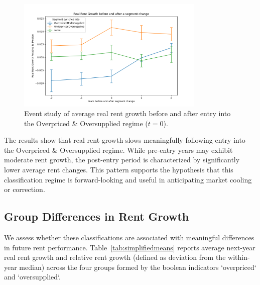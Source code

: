 \documentclass[APA,Times1COL]{WileyNJDv5} %
\begin{document}
\begin{figure}[h]
	\centering
	\includegraphics[width=0.8\textwidth]{event_study.png}
	\caption*{Event study of average real rent growth before and after entry into the Overpriced \& Oversupplied regime ($t=0$).}
	\label{fig:event_study}
\end{figure}

The results show that real rent growth slows meaningfully following entry into the Overpriced \& Oversupplied regime. While pre-entry years may exhibit moderate rent growth, the post-entry period is characterized by significantly lower average rent changes. This pattern supports the hypothesis that this classification regime is forward-looking and useful in anticipating market cooling or correction.

\subsection{Group Differences in Rent Growth}

We assess whether these classifications are associated with meaningful differences in future rent performance. Table~\ref{tab:simplifiedmeans} reports average next-year real rent growth and relative rent growth (defined as deviation from the within-year median) across the four groups formed by the boolean indicators `overpriced` and `oversupplied`.
\end{document}
